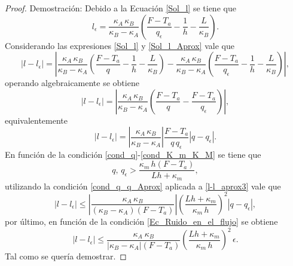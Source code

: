 \begin{proof}{Demostraci\'on:}
%
Debido a la Ecuaci\'on \eqref{Sol_l} se tiene que
%
\begin{equation}
\label{Sol_l_Aprox}
l_\epsilon=\dfrac{\kappa_A \, \kappa_B}{\kappa_B-\kappa_A}\left(\dfrac{F-T_a}{q_\epsilon}-\dfrac{1}{h}-\dfrac{L}{\kappa_B}\right).
\end{equation}
%       
Considerando las expresiones \eqref{Sol_l} y \eqref{Sol_l_Aprox} vale que 
%
\begin{equation*}
\label{l-l_aprox}
\left|l-l_\epsilon\right|=\left|\dfrac{\kappa_A \, \kappa_B}{\kappa_B-\kappa_A}\left(\dfrac{F-T_a}{q}-\dfrac{1}{h}-\dfrac{L}{\kappa_B}\right)-\dfrac{\kappa_A \, \kappa_B}{\kappa_B-\kappa_A}\left(\dfrac{F-T_a}{q_\epsilon}-\dfrac{1}{h}-\dfrac{L}{\kappa_B}\right)\right|,
\end{equation*}
%   
operando algebraicamente se obtiene
%
\begin{equation*}
\label{l-l_aprox2}
\left|l-l_\epsilon\right|=\left|\dfrac{\kappa_A \, \kappa_B}{\kappa_B-\kappa_A}\left(\dfrac{F-T_a}{q}-\dfrac{F-T_a}{q_\epsilon}\right)\right|,
\end{equation*}
% 
equivalentemente
%
\begin{equation}
\label{l-l_aprox3}
\left|l-l_\epsilon\right|=\left|\dfrac{\kappa_A \, \kappa_B}{\kappa_B-\kappa_A}\right| \dfrac{F-T_a}{q \, q_\epsilon} \left|q-q_\epsilon\right|.
\end{equation}
% 
En funci\'on de la condici\'on \eqref{cond_q}-\eqref{cond_K_m_K_M} se tiene que 
%
\begin{equation}
\label{cond_q_q_Aprox}
q, \, q_\epsilon>\dfrac{\kappa_m \, h (F-T_a)}{Lh+\kappa_m},
\end{equation}
%
utilizando la condici\'on \eqref{cond_q_q_Aprox} aplicada a \eqref{l-l_aprox3} vale que
%
\begin{equation*}
\left|l-l_\epsilon\right|\leq\left|\dfrac{\kappa_A \, \kappa_B}{(\kappa_B-\kappa_A) (F-T_a)}\right| \left(\dfrac{Lh+\kappa_m}{\kappa_m \, h}\right)^2 \left|q-q_\epsilon\right|,
\end{equation*}
% 
por \'ultimo, en funci\'on de la condici\'on \eqref{Ec_Ruido_en_el_flujo} se obtiene
%
\begin{equation}
\label{l-l_aprox4}
\left|l-l_\epsilon\right| \leq \dfrac{\kappa_A \ \kappa_B }{\left|\kappa_B - \kappa_A\right| (F-T_a)} \left(\dfrac{Lh+\kappa_m}{\kappa_m \, h}\right)^2 \, \epsilon.
\end{equation}
% 
Tal como se quer\'ia demostrar. 
%
\end{proof}
